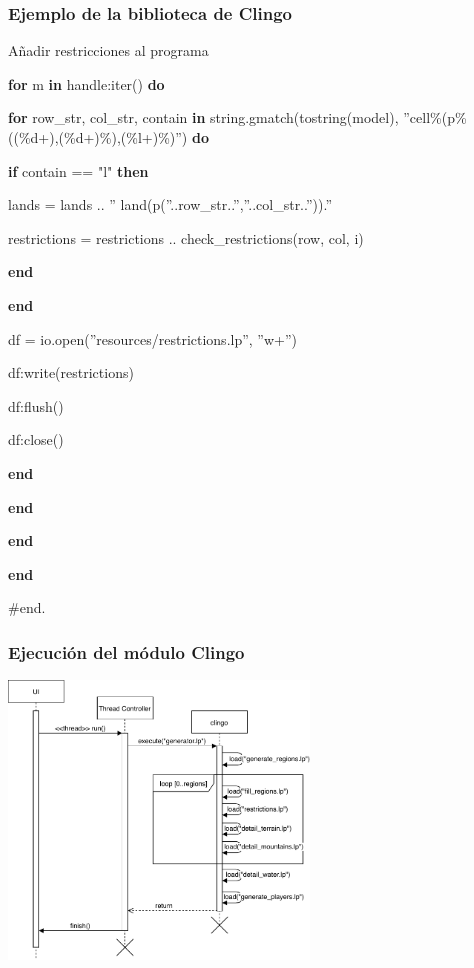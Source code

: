 \documentclass[10pt]{beamer}
\begin{document}
	\begin{frame}
	\frametitle{Ejemplo de la biblioteca de Clingo}
	
	\begin{block}{Añadir restricciones al programa}
	\ttfamily \footnotesize
	
	\hspace{6em} \textbf{for} m \textbf{in} handle:iter() \textbf{do}
	
	\hspace{8em} \textbf{for} row\_str, col\_str, contain \textbf{in} string.gmatch(tostring(model), 	''cell\%(p\%((\%d+),(\%d+)\%),(\%l+)\%)'') \textbf{do}
	
	\hspace{10em} \textbf{if} contain == "l"  \textbf{then}
	
	\hspace{12em} lands = lands .. '' land(p(''..row\_str..'',''..col\_str..'')).''
	
	\hspace{12em} restrictions = restrictions .. check\_restrictions(row, col, i)
	
	\hspace{10em} \textbf{end}
	
	\hspace{8em} \textbf{end}
	
	\vspace{1em}
	
	\hspace{8em} df = io.open(''resources/restrictions.lp'', ''w+'')
	
	\hspace{8em} df:write(restrictions)
	
	\hspace{8em} df:flush()
	
	\hspace{8em} df:close()
	
	\hspace{6em} \textbf{end}
	
	\hspace{4em} \textbf{end}
	
	\hspace{2em} \textbf{end}
	
	\textbf{end}
	
	\#end.
	\end{block}
	\end{frame}

	\begin{frame}
	\frametitle{Ejecución del módulo Clingo}
	
	\centering
	\includegraphics[width=0.6\textwidth]{images/diagrama-secuencia.pdf}
	
	\end{frame}
\end{document}
